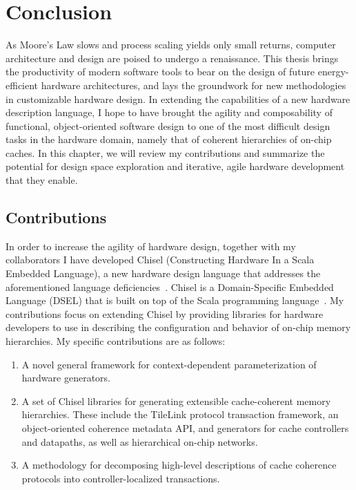 \chapter{Conclusion}
\label{c.conclusion}

As Moore's Law slows and process scaling yields only small returns,
computer architecture and design are poised to undergo a renaissance.
This thesis brings the productivity of modern software tools to bear
on the design of future energy-efficient hardware architectures,
and lays the groundwork for new methodologies in customizable hardware design.
In extending the capabilities of a new hardware description language, I hope to have brought the agility and composability of functional, object-oriented software design to one of the most difficult design tasks in the hardware domain,
namely that of coherent hierarchies of on-chip caches.
In this chapter, we will review my contributions and summarize the potential for design space exploration
and iterative, agile hardware development that they enable.

\section{Contributions}

In order to increase the agility of hardware design,
together with my collaborators I have developed Chisel (Constructing Hardware In a Scala Embedded Language), a new hardware design language that addresses the aforementioned language deficiencies~\cite{chisel}.
Chisel is a Domain-Specific Embedded Language (DSEL) that is built on top of the Scala programming language~\cite{scala}.
My contributions focus on extending Chisel by providing libraries for hardware developers to use in describing the configuration and behavior of on-chip memory hierarchies.
My specific contributions are as follows:

\begin{enumerate}
\item A novel general framework for context-dependent parameterization of hardware generators.
\item A set of Chisel libraries for generating extensible cache-coherent memory hierarchies.
These include the TileLink protocol transaction framework, an object-oriented coherence metadata API,
and generators for cache controllers and datapaths, as well as hierarchical on-chip networks.
\item A methodology for decomposing high-level descriptions of cache coherence protocols into controller-localized transactions.
\end{enumerate}

